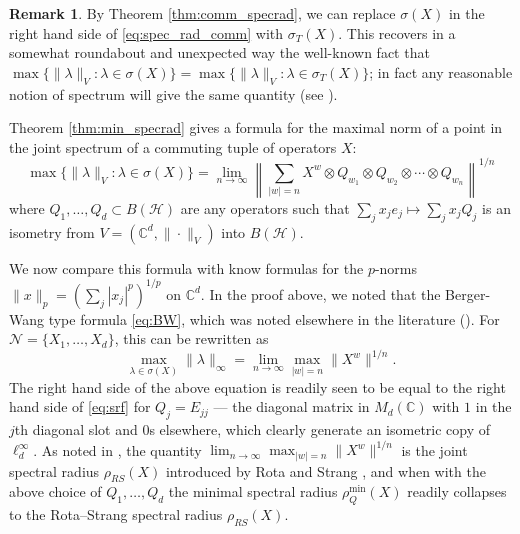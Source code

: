 \documentclass[12pt]{amsart}
\numberwithin{equation}{section}
\theoremstyle{definition}
\newtheorem{remark}[theorem]{Remark}
\newcommand{\cH}{\mathcal{H}}
\newcommand{\cN}{\mathcal{N}}
\newcommand{\bC}{\mathbb{C}}
\begin{document}
\begin{remark}
By Theorem \ref{thm:comm_specrad}, we can replace $\sigma(X)$ in the right hand side of \eqref{eq:spec_rad_comm} with $\sigma_T(X)$. 
This recovers in a somewhat roundabout and unexpected way the well-known fact that $\max\{\|\lambda\|_V : \lambda \in \sigma(X) \} = \max\{\|\lambda\|_V : \lambda \in \sigma_T(X) \}$; in fact any reasonable notion of spectrum will give the same quantity (see \cite[Corollary 10]{cho1992geometric}). 
\end{remark}


Theorem \ref{thm:min_specrad} gives a formula for the maximal norm of a point in the joint spectrum of a commuting tuple of operators $X$:
\begin{equation}\label{eq:srf}
\max\{\|\lambda\|_V : \lambda \in \sigma(X) \} = \lim_{n \to \infty} \left \|\sum_{|w|=n} X^w \otimes Q_{w_1} \otimes Q_{w_2} \otimes \cdots \otimes Q_{w_n} \right\|^{1/n}
\end{equation}
where $Q_1, \ldots, Q_d \subset B(\cH)$ are any operators such that $\sum_j x_j e_j \mapsto \sum_j x_j Q_j$ is an isometry from $V = \left(\bC^d, \|\cdot\|_V \right)$ into $B(\cH)$. 

We now compare this formula with know formulas for the $p$-norms $\|x\|_p = \left(\sum_j |x_j|^p\right)^{1/p}$ on $\bC^d$. 
In the proof above, we noted that the Berger-Wang type formula  \eqref{eq:BW}, which was noted elsewhere in the literature (\cite{shulman2002formulae,soltysiak1993joint}). 
For $\cN = \{X_1, \ldots, X_d\}$, this can be rewritten as 
\begin{equation}\label{eq:linf_srf}
\max_{\lambda \in \sigma(X)} \|\lambda\|_\infty = \lim_{n\to \infty} \max_{|w|=n}\|X^w\|^{1/n} .
\end{equation}
The right hand side of the above equation is readily seen to be equal to the right hand side of \eqref{eq:srf} for $Q_j = E_{jj}$ --- the diagonal matrix in $M_d(\bC)$ with $1$ in the $j$th diagonal slot and $0$s elsewhere, which clearly generate an isometric copy of $\ell^\infty_d$. 
As noted in \cite[Example 2.11]{shalsham2025spectral}, the quantity $\lim_{n\to \infty} \max_{|w|=n}\|X^w\|^{1/n}$ is the joint spectral radius $\rho_{RS}(X)$ introduced by Rota and Strang \cite{RS60}, and when with the above choice of $Q_1, \ldots, Q_d$ the minimal spectral radius $\rho_Q^{\min }(X)$ readily collapses to the Rota--Strang spectral radius $\rho_{RS}(X)$. 
\end{document}
